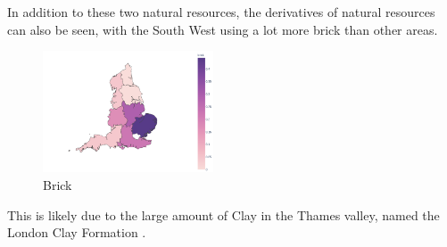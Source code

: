 \documentclass[11pt]{article}
\begin{document}
In addition to these two natural resources, the derivatives of natural resources can also be seen, with the South West using a lot more brick than other areas.

\begin{figure}[H]
	\centering
	\includegraphics[width=0.45\textwidth]{brick.png}
	\caption{Brick}
\end{figure}

This is likely due to the large amount of Clay in the Thames valley, named the London Clay Formation \cite{sumbler1996london}.





\end{document}
